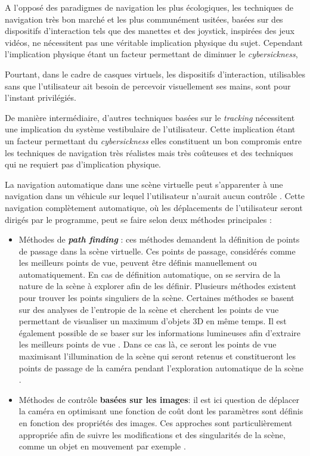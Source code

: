 A l'opposé des paradigmes de navigation les plus écologiques, les techniques de navigation très bon marché et les plus communément usitées, basées sur des dispositifs d'interaction tels que des manettes et des joystick, inspirées des jeux vidéos, ne nécessitent pas une véritable implication physique du sujet. Cependant l'implication physique étant un facteur permettant de diminuer le \textit{cybersickness},

Pourtant, dans le cadre de casques virtuels, les dispositifs d'interaction, utilisables sans que l'utilisateur ait besoin de percevoir visuellement ses mains, sont pour l'instant privilégiés. 

De manière intermédiaire, d'autres techniques basées sur le \textit{tracking} nécessitent une implication du système vestibulaire de l'utilisateur. Cette implication étant un facteur permettant du \textit{cybersickness} elles constituent un bon compromis entre les techniques de navigation très réalistes mais très coûteuses et des techniques qui ne requiert pas d'implication physique.


La navigation automatique dans une scène virtuelle peut s'apparenter à une navigation dans un véhicule sur lequel l'utilisateur n'aurait aucun contrôle \cite{habibi20143d}. Cette navigation complètement automatique, où les déplacements de l'utilisateur seront dirigés par le programme, peut se faire selon deux méthodes principales :

\begin{itemize}
  \item Méthodes de \textit{\textbf{path finding}} : ces méthodes demandent la définition de points de passage dans la scène virtuelle. Ces points de passage, considérés comme les meilleurs points de vue, peuvent être définis manuellement ou automatiquement. En cas de définition automatique, on se servira de la nature de la scène à explorer afin de les définir. Plusieurs méthodes existent pour trouver les points singuliers de la scène. Certaines méthodes  se basent sur des analyses de l'entropie de la scène et cherchent les points de vue permettant de visualiser un maximum d'objets 3D en même temps\cite{vazquez2001viewpoint}. Il est également possible de se baser sur les informations lumineuses afin d'extraire les meilleurs points de vue . Dans ce cas là, ce seront les points de vue maximisant l'illumination de la scène qui seront retenus et constitueront les points de passage de la caméra pendant l'exploration automatique de la scène \cite{gumhold2002maximum}.
  \item Méthodes de contrôle \textbf{basées sur les images}: il est ici question de déplacer la caméra en optimisant une fonction de coût dont les paramètres sont définis en fonction des propriétés des images.  Ces approches sont particulièrement appropriée afin de suivre les modifications et des singularités de la scène, comme un objet en mouvement par exemple \cite{courty2001computer}. 
\end{itemize}

